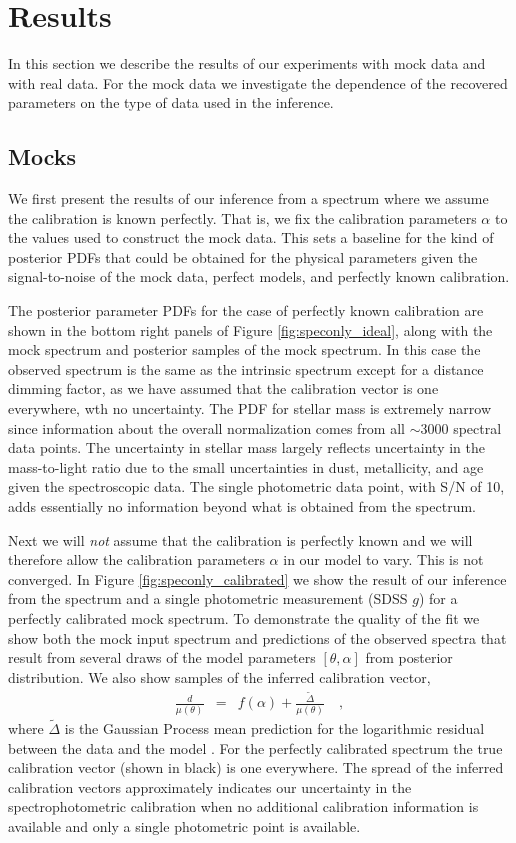 \documentclass[iop,numberedappendix]{emulateapj}
\begin{document}
\section{Results}

In this section we describe the results of our experiments with mock
data and with real data.  For the mock data we investigate the
dependence of the recovered parameters on the type of data used in the
inference.

\subsection{Mocks}
We first present the results of our inference from a spectrum where we
assume the calibration is known perfectly.  That is, we fix the
calibration parameters $\alpha$ to the values used to construct the
mock data.  This sets a baseline for the kind of posterior PDFs that
could be obtained for the physical parameters given the
signal-to-noise of the mock data, perfect models, and perfectly known
calibration.

The posterior parameter PDFs for the case of perfectly known
calibration are shown in the bottom right panels of Figure
\ref{fig:speconly_ideal}, along with the mock spectrum and posterior
samples of the mock spectrum.  In this case the observed spectrum is
the same as the intrinsic spectrum except for a distance dimming
factor, as we have assumed that the calibration vector is one
everywhere, wth no uncertainty. The PDF for stellar mass is extremely
narrow since information about the overall normalization comes from all
$\sim 3000$ spectral data points.  The uncertainty in stellar mass
largely reflects uncertainty in the mass-to-light ratio due to the
small uncertainties in dust, metallicity, and age given the
spectroscopic data. The single photometric data point,
with S/N of 10, adds essentially no information beyond what is
obtained from the spectrum.

Next we will \emph{not} assume that the calibration is perfectly known
and we will therefore allow the calibration parameters $\alpha$ in our
model to vary.  {\color{red} This is not converged.} In Figure
\ref{fig:speconly_calibrated} we show the result of our inference from
the spectrum and a single photometric measurement (SDSS $g$) for a
perfectly calibrated mock spectrum. To demonstrate the quality of the
fit we show both the mock input spectrum and predictions of the
observed spectra that result from several draws of the model
parameters $[\theta, \alpha]$ from posterior distribution.  We also
show samples of the inferred calibration vector,
\begin{eqnarray} \label{eq:calibration}
\frac{d}{\mu(\theta)} & = & f(\alpha) + \frac{\tilde{\Delta}}{\mu(\theta)}
\quad ,
\end{eqnarray}
where $\tilde{\Delta}$ is the Gaussian Process mean prediction for the
logarithmic residual between the data and the model \citep{RW}.  For the
perfectly calibrated spectrum the true calibration vector (shown in
black) is one everywhere.  The spread of the inferred calibration
vectors approximately indicates our uncertainty in the spectrophotometric
calibration when no additional calibration information is available
and only a single photometric point is available.
\end{document}
